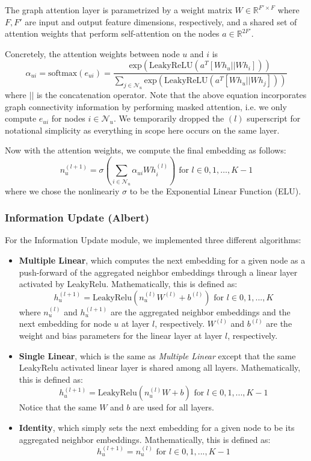 \documentclass{article}
\begin{document}
\begin{itemize}
    The graph attention layer is parametrized by a weight matrix $W \in \mathbb{R}^{F' \times F}$ where $F, F'$ are input and output feature dimensions, respectively, and a shared set of attention weights that perform self-attention on the nodes $a \in \mathbb{R}^{2F'}$. 

    Concretely, the attention weights between node $u$ and $i$ is $$\alpha_{ui} = \text{softmax} (e_{ui}) = \frac{\text{exp}(\text{LeakyReLU} (a^T [Wh_u || Wh_i]) )}{\sum_{j\in \mathcal{N}_u}  \text{exp}(\text{LeakyReLU} (a^T [Wh_u || Wh_j]) )}$$
    where $||$ is the concatenation operator. Note that the above equation incorporates graph connectivity information by performing masked attention, i.e. we only compute $e_{ui}$ for nodes $i\in \mathcal{N}_u$. We temporarily dropped the ${(l)}$ superscript for notational simplicity as everything in scope here occurs on the same layer.

    Now with the attention weights, we compute the final embedding as follows: $$n_u^{(l + 1)} = \sigma ( \sum_{i\in \mathcal{N}_u} \alpha_{ui} W h_i^{(l)}  ) \text{ for } l \in 0, 1, \hdots, K - 1 $$ where we chose the nonlineariy $\sigma$ to be the Exponential Linear Function (ELU).
\end{itemize}

\subsubsection{Information Update (Albert)}

For the Information Update module, we implemented three different algorithms:
\begin{itemize}
    \item \textbf{Multiple Linear}, which computes the next embedding for a given node as a push-forward of the aggregated neighbor embeddings through a linear layer activated by LeakyRelu. Mathematically, this is defined as:
    $$
    h_u^{(l+1)} = \mbox{LeakyRelu}(n_u^{(l)} W^{(l)} + b^{(l)}) \text{ for } l \in 0, 1, ..., K
    $$
    where $n_u^{(l)}$ and $h_u^{(l+1)}$ are the aggregated neighbor embeddings and the next embedding for node $u$ at layer $l$, respectively. $W^{(l)}$ and $b^{(l)}$ are the weight and bias parameters for the linear layer at layer $l$, respectively.
    \item \textbf{Single Linear}, which is the same as \textit{Multiple Linear} except that the same LeakyRelu activated linear layer is shared among all layers. Mathematically, this is defined as:
    $$
    h_u^{(l+1)} = \mbox{LeakyRelu}(n_u^{(l)} W + b) \text{ for } l \in 0, 1, ..., K - 1
    $$
    Notice that the same $W$ and $b$ are used for all layers.
    \item \textbf{Identity}, which simply sets the next embedding for a given node to be its aggregated neighbor embeddings. Mathematically, this is defined as:
    $$
    h_u^{(l+1)} = n_u^{(l)} \text{ for } l \in 0, 1, ..., K - 1
    $$
\end{itemize}
\end{document}
